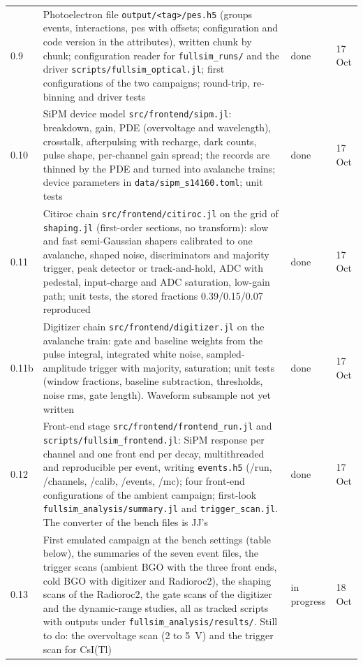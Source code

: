 \documentclass[11pt]{article}
\newcommand{\code}[1]{\texttt{#1}}
\newcommand{\csitl}{CsI(Tl)\xspace}
\newcommand{\doing}{in progress}
\newcommand{\done}{done}
\begin{document}
\begin{longtable}{p{} p{} p{} p{}}
0.9 & Photoelectron file \code{output/<tag>/pes.h5} (groups events, interactions, pes with offsets; configuration and code version in the attributes), written chunk by chunk; configuration reader for \code{fullsim\_runs/} and the driver \code{scripts/fullsim\_optical.jl}; first configurations of the two campaigns; round-trip, re-binning and driver tests & \done & 17 Oct \\
0.10 & SiPM device model \code{src/frontend/sipm.jl}: breakdown, gain, PDE (overvoltage and wavelength), crosstalk, afterpulsing with recharge, dark counts, pulse shape, per-channel gain spread; the records are thinned by the PDE and turned into avalanche trains; device parameters in \code{data/sipm\_s14160.toml}; unit tests & \done & 17 Oct \\
0.11 & Citiroc chain \code{src/frontend/citiroc.jl} on the grid of \code{shaping.jl} (first-order sections, no transform): slow and fast semi-Gaussian shapers calibrated to one avalanche, shaped noise, discriminators and majority trigger, peak detector or track-and-hold, ADC with pedestal, input-charge and ADC saturation, low-gain path; unit tests, the stored fractions 0.39/0.15/0.07 reproduced & \done & 17 Oct \\
0.11b & Digitizer chain \code{src/frontend/digitizer.jl} on the avalanche train: gate and baseline weights from the pulse integral, integrated white noise, sampled-amplitude trigger with majority, saturation; unit tests (window fractions, baseline subtraction, thresholds, noise rms, gate length). Waveform subsample not yet written & \done & 17 Oct \\
0.12 & Front-end stage \code{src/frontend/frontend\_run.jl} and \code{scripts/fullsim\_frontend.jl}: SiPM response per channel and one front end per decay, multithreaded and reproducible per event, writing \code{events.h5} (/run, /channels, /calib, /events, /mc); four front-end configurations of the ambient campaign; first-look \code{fullsim\_analysis/summary.jl} and \code{trigger\_scan.jl}. The converter of the bench files is JJ's & \done & 17 Oct \\
0.13 & First emulated campaign at the bench settings (table below), the summaries of the seven event files, the trigger scans (ambient BGO with the three front ends, cold BGO with digitizer and Radioroc2), the shaping scans of the Radioroc2, the gate scans of the digitizer and the dynamic-range studies, all as tracked scripts with outputs under \code{fullsim\_analysis/results/}. Still to do: the overvoltage scan (2 to 5~V) and the trigger scan for \csitl & \doing & 18 Oct \\

\end{longtable}
\end{document}
